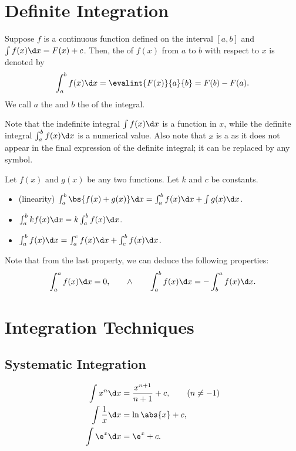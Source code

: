 \section{Definite Integration}

\begin{definition}
    Suppose $f$ is a continuous function defined on the interval $[a, b]$ and $\int f(x) \d x = F(x) + c$. Then, the  of $f(x)$ from $a$ to $b$ with respect to $x$ is denoted by \[\int_a^b f(x) \d x = \evalint{F(x)}{a}{b} = F(b) - F(a).\] We call $a$ the  and $b$ the  of the integral.
\end{definition}

Note that the indefinite integral $\int f(x) \d x$ is a function in $x$, while the definite integral $\int_a^b f(x) \d x$ is a numerical value. Also note that $x$ is a  as it does not appear in the final expression of the definite integral; it can be replaced by any symbol.

\begin{fact}
    Let $f(x)$ and $g(x)$ be any two functions. Let $k$ and $c$ be constants.
    \begin{itemize}
        \item (linearity) $\int_a^b \bs{f(x) + g(x)} \d x = \int_a^b f(x) \d x + \int g(x) \d x$.
        \item $\int_a^b k f(x) \d x = k \int_a^b f(x) \d x$.
        \item $\int_a^b f(x) \d x = \int_a^c f(x) \d x + \int_c^b f(x) \d x$.
    \end{itemize}
\end{fact}

Note that from the last property, we can deduce the following properties: \[\int_a^a f(x) \d x = 0, \qquad \land \qquad \int_a^b f(x) \d x = -\int_b^a f(x) \d x.\]

\section{Integration Techniques}

\subsection{Systematic Integration}

\begin{proposition}
    \begin{align*}
        \int x^n \d x &= \frac{x^{n+1}}{n+1} + c, \tag{$n \neq -1$}\\
        \int \frac1x \d x &= \ln \abs{x} + c,\\
        \int \e^x \d x &= \e^x + c.
    \end{align*}
\end{proposition}

